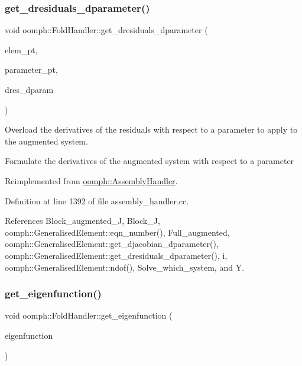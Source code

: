 \subsubsection{\texorpdfstring{get\+\_\+dresiduals\+\_\+dparameter()}{get\_dresiduals\_dparameter()}}
{\footnotesize\ttfamily void oomph\+::\+Fold\+Handler\+::get\+\_\+dresiduals\+\_\+dparameter (\begin{DoxyParamCaption}\item[{\hyperlink{classoomph_1_1GeneralisedElement}{Generalised\+Element} $\ast$const \&}]{elem\+\_\+pt,  }\item[{double $\ast$const \&}]{parameter\+\_\+pt,  }\item[{\hyperlink{classoomph_1_1Vector}{Vector}$<$ double $>$ \&}]{dres\+\_\+dparam }\end{DoxyParamCaption})\hspace{0.3cm}{\ttfamily [virtual]}}



Overload the derivatives of the residuals with respect to a parameter to apply to the augmented system. 

Formulate the derivatives of the augmented system with respect to a parameter 

Reimplemented from \hyperlink{classoomph_1_1AssemblyHandler_a2ee980ccabe0ad82f98e694eecf270bb}{oomph\+::\+Assembly\+Handler}.



Definition at line 1392 of file assembly\+\_\+handler.\+cc.



References Block\+\_\+augmented\+\_\+J, Block\+\_\+J, oomph\+::\+Generalised\+Element\+::eqn\+\_\+number(), Full\+\_\+augmented, oomph\+::\+Generalised\+Element\+::get\+\_\+djacobian\+\_\+dparameter(), oomph\+::\+Generalised\+Element\+::get\+\_\+dresiduals\+\_\+dparameter(), i, oomph\+::\+Generalised\+Element\+::ndof(), Solve\+\_\+which\+\_\+system, and Y.

\mbox{\label{classoomph_1_1FoldHandler_aca97058722ccc1482ae8180ea8dde74c}} 
\subsubsection{\texorpdfstring{get\+\_\+eigenfunction()}{get\_eigenfunction()}}
{\footnotesize\ttfamily void oomph\+::\+Fold\+Handler\+::get\+\_\+eigenfunction (\begin{DoxyParamCaption}\item[{\hyperlink{classoomph_1_1Vector}{Vector}$<$ \hyperlink{classoomph_1_1DoubleVector}{Double\+Vector} $>$ \&}]{eigenfunction }\end{DoxyParamCaption})\hspace{0.3cm}{\ttfamily [virtual]}}



